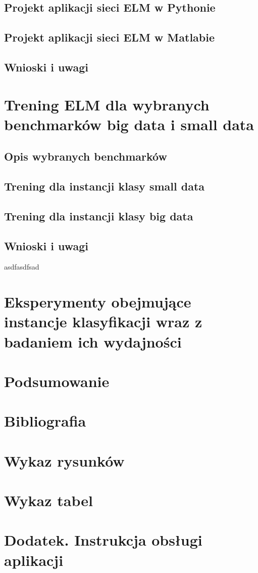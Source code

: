 \documentclass{article}
\begin{document}
\subsection{Projekt aplikacji sieci ELM w Pythonie}
\subsection{Projekt aplikacji sieci ELM w Matlabie}
\subsection{Wnioski i uwagi}
\section{Trening ELM dla wybranych benchmarków big data i small data}
\subsection{Opis wybranych benchmarków}
\subsection{Trening dla instancji klasy small data}
\subsection{Trening dla instancji klasy big data}
\subsection{Wnioski i uwagi}
asdfasdfsad
\section{Eksperymenty obejmujące instancje klasyfikacji wraz z badaniem ich wydajności}
\section*{Podsumowanie}
\section*{Bibliografia}
\section*{Wykaz rysunków}
\section*{Wykaz tabel}
\section*{Dodatek. Instrukcja obsługi aplikacji}
\end{document}
